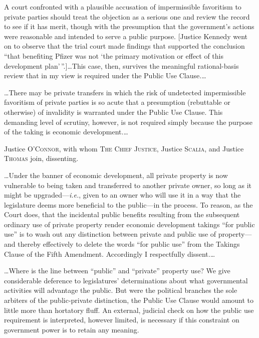 A court confronted with a plausible accusation of impermissible favoritism to
private parties should treat the objection as a serious one and review the
record to see if it has merit, though with the presumption that the government's
actions were reasonable and intended to serve a public purpose. [Justice Kennedy
went on to observe that the trial court made findings that supported the
conclusion ``that benefiting Pfizer was not `the primary motivation or effect of
this development plan'\,''.]\ldots This case, then, survives the meaningful
rational-basis review that in my view is required under the Public Use
Clause.\ldots

\ldots There may be private transfers in which the risk of undetected
impermissible favoritism of private parties is so acute that a presumption
(rebuttable or otherwise) of invalidity is warranted under the Public Use
Clause. This demanding level of scrutiny, however, is not required simply
because the purpose of the taking is economic development.\ldots

\opinion Justice O'\textsc{Connor}, with whom \textsc{The Chief Justice},
Justice \textsc{Scalia}, and Justice \textsc{Thomas} join, dissenting.

\ldots Under the banner of economic development, all private property is now
vulnerable to being taken and transferred to another private owner, so long as
it might be upgraded---\textit{i.e.}, given to an owner who will use it in a way
that the legislature deems more beneficial to the public---in the process. To
reason, as the Court does, that the incidental public benefits resulting from
the subsequent ordinary use of private property render economic development
takings ``for public use'' is to wash out any distinction between private and
public use of property---and thereby effectively to delete the words ``for
public use'' from the Takings Clause of the Fifth Amendment. Accordingly I
respectfully dissent.\ldots

\ldots Where is the line between ``public'' and ``private'' property use? We
give considerable deference to legislatures' determinations about what
governmental activities will advantage the public. But were the political
branches the sole arbiters of the public-private distinction, the Public Use
Clause would amount to little more than hortatory fluff. An external, judicial
check on how the public use requirement is interpreted, however limited, is
necessary if this constraint on government power is to retain any meaning. 

